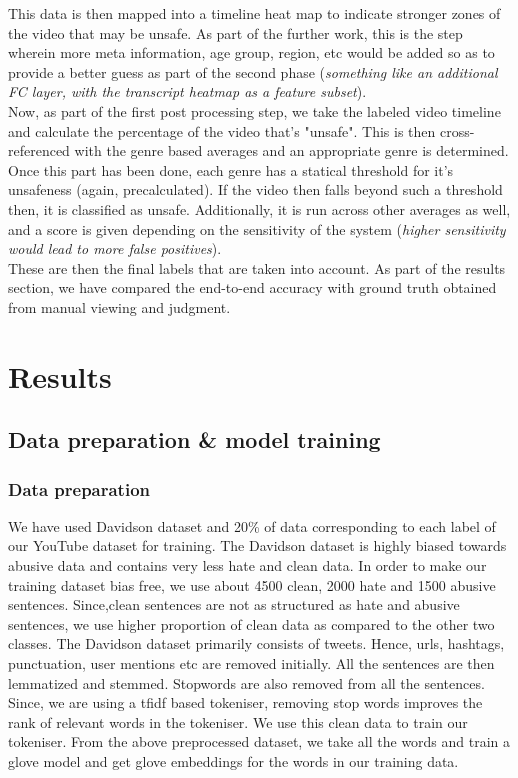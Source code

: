 \documentclass{article}[A4]
\begin{document}
This data is then mapped into a timeline heat map to indicate stronger zones of the video that may be unsafe. As part of the further work, this is the step wherein more meta information, age group, region, etc would be added so as to provide a better guess as part of the second phase (\textit{something like an additional FC layer, with the transcript heatmap as a feature subset}). \\

Now, as part of the first post processing step, we take the labeled video timeline and calculate the percentage of the video that's "unsafe". This is then cross-referenced with the genre based averages and an appropriate genre is determined. Once this part has been done, each genre has a statical threshold for it's unsafeness (again, precalculated). If the video then falls beyond such a threshold then, it is classified as unsafe. Additionally, it is run across other averages as well, and a score is given depending on the sensitivity of the system (\textit{higher sensitivity would lead to more false positives}). \\

These are then the final labels that are taken into account. As part of the results section, we have compared the end-to-end accuracy with ground truth obtained from manual viewing and judgment.

\section{Results}

\subsection{Data preparation \& model training}
\subsubsection{Data preparation}
We have used Davidson dataset and 20\% of data corresponding to each label of our YouTube dataset for training. The Davidson dataset is highly biased towards abusive data and contains very less hate and clean data. In order to make our training dataset bias free, we use about 4500 clean, 2000 hate and 1500 abusive sentences. Since,clean sentences are not as structured as hate and abusive sentences, we use higher proportion of clean data as compared to the other two classes.
The Davidson dataset primarily consists of tweets. Hence, urls, hashtags, punctuation, user mentions etc are removed initially. All the sentences are then lemmatized and stemmed. Stopwords are also removed from all the sentences. Since, we are using a tfidf based tokeniser, removing stop words improves the rank of relevant words in the tokeniser. We use this clean data to train our tokeniser.
 From the above preprocessed dataset, we take all the words and train a glove model and get glove embeddings for the words in our training data. 
\end{document}
